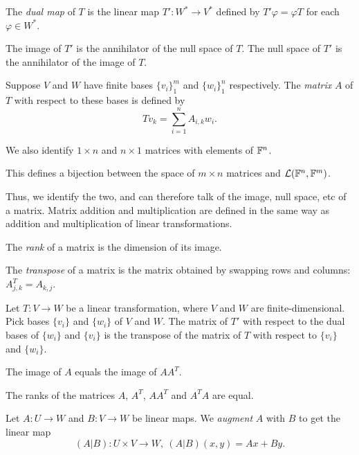 \begin{defn}
  The \emph{dual map} of $T$ is the linear map $T':W^*\to V^*$ defined by
  $T'\varphi=\varphi T$ for each $\varphi\in W^*$.
\end{defn}
\begin{prop}
    The image of $T'$ is the annihilator of the null space of $T$. The null
    space of $T'$ is the annihilator of the image of $T$.
\end{prop}
\begin{defn}
  Suppose $V$ and $W$ have finite bases $\{v_i\}_1^m$ and $\{w_i\}_1^n$
  respectively. The \emph{matrix} $A$ of $T$ with respect to these bases is
  defined by
  \[Tv_k=\sum_{i=1}^n A_{i,k}w_i.\]

  We also identify $1\times n$ and $n\times 1$ matrices with elements of
  $\mathbb{F}^n$.
\end{defn}
\begin{prop}
  This defines a bijection between the space of $m\times n$ matrices and
  $\mathcal L(\mathbb{F}^n,\mathbb{F}^m)$.
\end{prop}
\begin{defn}
  Thus, we identify the two, and can therefore talk of the image, null space,
  etc of a matrix.
  Matrix addition and multiplication are defined in the same way as addition and
  multiplication of linear transformations.
\end{defn}
\begin{defn}
  The \emph{rank} of a matrix is the dimension of its image.

  The \emph{transpose} of a matrix is the matrix obtained by swapping rows and
  columns: $A^T_{j,k}=A_{k,j}$.
\end{defn}
\begin{prop}
  Let $T:V\to W$ be a linear transformation, where $V$ and $W$ are
  finite-dimensional. Pick bases $\{v_i\}$ and $\{w_i\}$ 
  of $V$ and $W$. The matrix of $T'$ with respect
  to the dual bases of $\{w_i\}$ and $\{v_i\}$ 
  is the transpose of the matrix of $T$ with respect to $\{v_i\}$ and $\{w_i\}$.
\end{prop}
\begin{prop}
    The image of $A$ equals the image of $AA^T$.
\end{prop}
\begin{cor}
    The ranks of the matrices $A$, $A^T$, $AA^T$ and $A^T A$ are equal.
\end{cor}
\begin{defn}
  Let $A:U\to W$ and
  $B:V\to W$ be linear maps. We \emph{augment} $A$ with $B$ to get the linear
  map
  \[(A|B):U\times V\to W,\ (A|B)(x,y)=Ax+By.\]
\end{defn}
